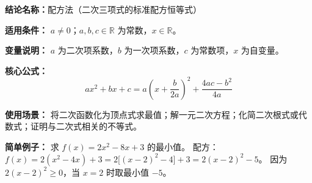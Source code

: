 \textbf{结论名称：}配方法（二次三项式的标准配方恒等式）

\textbf{适用条件：} \(a \neq 0\)；\(a,b,c \in \mathbb{R}\) 为常数，\(x \in \mathbb{R}\)。

\textbf{变量说明：} \(a\) 为二次项系数，\(b\) 为一次项系数，\(c\) 为常数项，\(x\) 为自变量。

\textbf{核心公式：}
\[
\boxed{ax^{2}+bx+c = a\left(x+\frac{b}{2a}\right)^{2} + \frac{4ac-b^{2}}{4a}}
\]

\textbf{使用场景：} 将二次函数化为顶点式求最值；解一元二次方程；化简二次根式或代数式；证明与二次式相关的不等式。

\textbf{简单例子：} 求 \(f(x)=2x^{2}-8x+3\) 的最小值。
配方：\(f(x)=2(x^{2}-4x)+3=2\big[(x-2)^{2}-4\big]+3=2(x-2)^{2}-5\)。
因为 \(2(x-2)^{2} \ge 0\)，当 \(x=2\) 时取最小值 \(-5\)。
